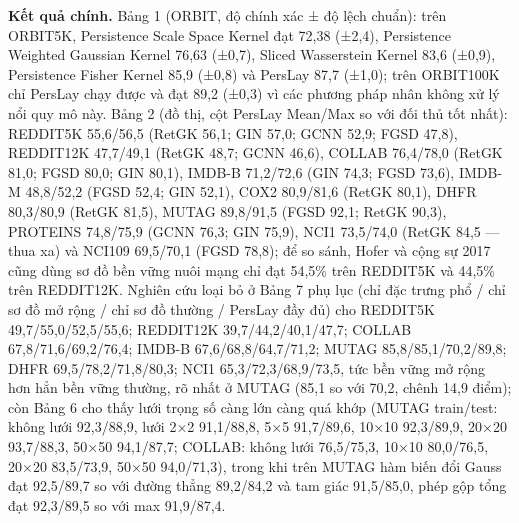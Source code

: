 \documentclass[12pt,a4paper]{article}
\begin{document}
\noindent \textbf{Kết quả chính.} Bảng 1 (ORBIT, độ chính xác ± độ lệch chuẩn): trên ORBIT5K, Persistence Scale Space Kernel đạt 72,38 (±2,4), Persistence Weighted Gaussian Kernel 76,63 (±0,7), Sliced Wasserstein Kernel 83,6 (±0,9), Persistence Fisher Kernel 85,9 (±0,8) và PersLay 87,7 (±1,0); trên ORBIT100K chỉ PersLay chạy được và đạt 89,2 (±0,3) vì các phương pháp nhân không xử lý nổi quy mô này. Bảng 2 (đồ thị, cột PersLay Mean/Max so với đối thủ tốt nhất): REDDIT5K 55,6/56,5 (RetGK 56,1; GIN 57,0; GCNN 52,9; FGSD 47,8), REDDIT12K 47,7/49,1 (RetGK 48,7; GCNN 46,6), COLLAB 76,4/78,0 (RetGK 81,0; FGSD 80,0; GIN 80,1), IMDB-B 71,2/72,6 (GIN 74,3; FGSD 73,6), IMDB-M 48,8/52,2 (FGSD 52,4; GIN 52,1), COX2 80,9/81,6 (RetGK 80,1), DHFR 80,3/80,9 (RetGK 81,5), MUTAG 89,8/91,5 (FGSD 92,1; RetGK 90,3), PROTEINS 74,8/75,9 (GCNN 76,3; GIN 75,9), NCI1 73,5/74,0 (RetGK 84,5 — thua xa) và NCI109 69,5/70,1 (FGSD 78,8); để so sánh, Hofer và cộng sự 2017 cũng dùng sơ đồ bền vững nuôi mạng chỉ đạt 54,5\% trên REDDIT5K và 44,5\% trên REDDIT12K. Nghiên cứu loại bỏ ở Bảng 7 phụ lục (chỉ đặc trưng phổ / chỉ sơ đồ mở rộng / chỉ sơ đồ thường / PersLay đầy đủ) cho REDDIT5K 49,7/55,0/52,5/55,6; REDDIT12K 39,7/44,2/40,1/47,7; COLLAB 67,8/71,6/69,2/76,4; IMDB-B 67,6/68,8/64,7/71,2; MUTAG 85,8/85,1/70,2/89,8; DHFR 69,5/78,2/71,8/80,3; NCI1 65,3/72,3/68,9/73,5, tức bền vững mở rộng hơn hẳn bền vững thường, rõ nhất ở MUTAG (85,1 so với 70,2, chênh 14,9 điểm); còn Bảng 6 cho thấy lưới trọng số càng lớn càng quá khớp (MUTAG train/test: không lưới 92,3/88,9, lưới 2×2 91,1/88,8, 5×5 91,7/89,6, 10×10 92,3/89,9, 20×20 93,7/88,3, 50×50 94,1/87,7; COLLAB: không lưới 76,5/75,3, 10×10 80,0/76,5, 20×20 83,5/73,9, 50×50 94,0/71,3), trong khi trên MUTAG hàm biến đổi Gauss đạt 92,5/89,7 so với đường thẳng 89,2/84,2 và tam giác 91,5/85,0, phép gộp tổng đạt 92,3/89,5 so với max 91,9/87,4.\par\vspace{3pt}
\end{document}
